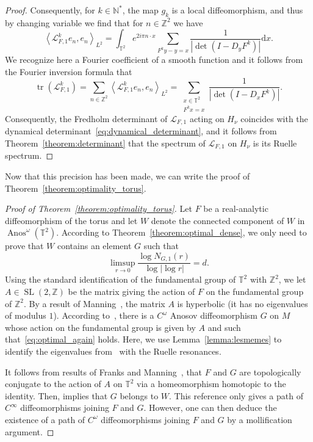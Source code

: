 \documentclass[10pt]{amsart}
\theoremstyle{definition}\newtheorem{defi}[theo]{Definition}\newtheorem{rema}[theo]{Remark}\newtheorem{exam}[theo]{Example}\newtheorem{exem}[theo]{Example}\newtheorem{nota}[theo]{Notation}
\DeclareMathOperator{\Anos}{Anos}
\DeclareMathOperator{\tr}{tr}
\DeclareMathOperator{\SL}{SL}
\newcommand{\p}[1]{\left(#1\right)}
\newcommand{\va}[1]{\left|#1\right|}
\newcommand{\clL}{\mathcal{L}}
\newcommand{\bbZ}{\mathbb{Z}}
\newcommand{\bbT}{\mathbb{T}}
\newcommand{\bbN}{\mathbb{N}}
\newcommand{\rmd}{\mathrm{d}}
\newcommand*{\MK}{\mkern 2mu}
\begin{document}
\begin{proof}
Consequently, for $k \in \bbN^*$, the map $g_k$ is a local diffeomorphism, and thus by changing variable we find that for $n \in \bbZ^2$ we have
\begin{equation*}
\left\langle\clL_{F,1}^k e_n, e_n\right\rangle_{L^2} = \int_{\bbT^2} e^{2 i \pi n \cdot x} \sum_{F^k y -y = x} \frac{1}{\va{\det\p{I - D_y F^k}}} \rmd x.
\end{equation*}
We recognize here a Fourier coefficient of a smooth function and it follows from the Fourier inversion formula that
\begin{equation*}
\tr \p{\clL_{F,1}^k} = \sum_{n \in \bbZ^2} \left\langle\clL_{F,1}^k e_n, e_n\right\rangle_{L^2} = \sum_{\substack{x \in \bbT^2\\
F^k x = x}}\frac{1}{\va{\det\p{I - D_x F^k}}}.
\end{equation*}
Consequently, the Fredholm determinant of $\clL_{F,1}$ acting on $H_\nu$ coincides with the dynamical determinant~\eqref{eq:dynamical_determinant}, and it follows from Theorem~\ref{theorem:determinant} that the spectrum of $\clL_{F,1}$ on $H_\nu$ is its Ruelle spectrum.
\end{proof}

Now that this precision has been made, we can write the proof of Theorem~\ref{theorem:optimality_torus}.

\begin{proof}[Proof of Theorem~\ref{theorem:optimality_torus}]
Let $F$ be a real-analytic diffeomorphism of the torus and let $W$ denote the connected component of $W$ in $\Anos^\omega(\bbT^2)$. According to Theorem~\ref{theorem:optimal_dense}, we only need to prove that $W$ contains an element $G$ such that
\begin{equation}\label{eq:optimal_again}
\limsup_{r \to 0} \frac{\log N_{G,1}(r)}{\log \va{\log r}} = d.
\end{equation}
Using the standard identification of the fundamental group of $\bbT^2$ with $\bbZ^2$, we let $A \in \SL(2,\bbZ)$ be the matrix giving the action of $F$ on the fundamental group of $\bbZ^2$. By a result of Manning~\cite{no_new}, the matrix $A$ is hyperbolic (it has no eigenvalues of modulus $1$). According to~\cite[Theorem~1.3$\MK$(i)]{optimal_examples}, there is a $C^\omega$ Anosov diffeomorphism $G$ on $M$ whose action on the fundamental group is given by $A$ and such that~\eqref{eq:optimal_again} holds. Here, we use Lemma~\ref{lemma:lesmemes} to identify the eigenvalues from~\cite{optimal_examples} with the Ruelle resonances.

It follows from results of Franks and Manning~\cite{franks_classification, no_new}, that $F$ and $G$ are topologically conjugate to the action of $A$ on $\bbT^2$ via a homeomorphism homotopic to the identity. Then, \cite[Theorem~1]{space_Anosov} implies that $G$ belongs to $W$. This reference only gives a path of $C^\infty$ diffeomorphisms joining $F$ and $G$. However, one can then deduce the existence of a path of $C^\omega$ diffeomorphisms joining $F$ and $G$ by a mollification argument.
\end{proof}
\end{document}
